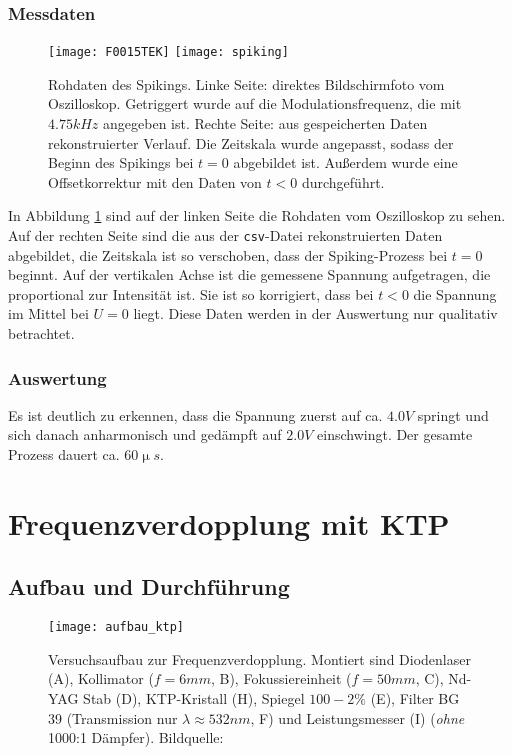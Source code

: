 \documentclass{../Misc/MontavonLaTeX/Montavon}
\newcommand{\halfwidth}{0.48\textwidth}
\newcommand{\fullwidth}{1.0\textwidth}
\begin{document}
\subsubsection{Messdaten}
\begin{figure}
\centering
\texttt{[image: F0015TEK]}
\texttt{[image: spiking]}
\caption{Rohdaten des Spikings. Linke Seite: direktes Bildschirmfoto vom Oszilloskop. Getriggert wurde auf die Modulationsfrequenz, die mit $4.75 \unit{kHz}$ angegeben ist. Rechte Seite: aus gespeicherten Daten rekonstruierter Verlauf. Die Zeitskala wurde angepasst, sodass der Beginn des Spikings bei $t = 0$ abgebildet ist. Außerdem wurde eine Offsetkorrektur mit den Daten von $t < 0$ durchgeführt.}
\label{fig:spiking}
\end{figure}

In Abbildung \ref{fig:spiking} sind auf der linken Seite die Rohdaten vom Oszilloskop zu sehen. Auf der rechten Seite sind die aus der \texttt{csv}-Datei rekonstruierten Daten abgebildet, die Zeitskala ist so verschoben, dass der Spiking-Prozess bei $t = 0$ beginnt. Auf der vertikalen Achse ist die gemessene Spannung aufgetragen, die proportional zur Intensität ist. Sie ist so korrigiert, dass bei $t < 0$ die Spannung im Mittel bei $U = 0$ liegt.
Diese Daten werden in der Auswertung nur qualitativ betrachtet.

\subsubsection{Auswertung}
Es ist deutlich zu erkennen, dass die Spannung zuerst auf ca. $4.0 \unit{V}$ springt und sich danach anharmonisch und gedämpft auf $2.0 \unit{V}$ einschwingt. Der gesamte Prozess dauert ca. $60 \unit{\upmu s}$.

\section{Frequenzverdopplung mit KTP}
\subsection{Aufbau und Durchführung}
\begin{figure}[htbp]
\centering
\texttt{[image: aufbau\_ktp]}
\caption{Versuchsaufbau zur Frequenzverdopplung. Montiert sind Diodenlaser (A), Kollimator ($f = 6 \unit{mm}$, B), Fokussiereinheit ($f = 50 \unit{mm}$, C), Nd-YAG Stab (D), KTP-Kristall (H), Spiegel $100-2 \unit{\%}$ (E), Filter BG 39 (Transmission nur $\lambda \approx 532 \unit{nm}$, F) und Leistungsmesser (I) (\emph{ohne} 1000:1 Dämpfer). Bildquelle: \cite[S. 38]{anleitung1}}
\label{fig:aufbau_ktp}
\end{figure}
\end{document}
